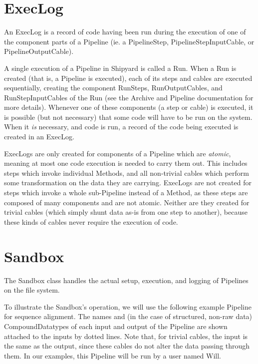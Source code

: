 \documentclass[12pt]{article}
\begin{document}
\section*{ExecLog}

An ExecLog is a record of code having been run during the execution of
one of the component parts of a Pipeline (ie. a PipelineStep,
PipelineStepInputCable, or PipelineOutputCable).

A single execution of a Pipeline in Shipyard is called a Run. When a Run
is created (that is, a Pipeline is executed), each of its steps and
cables are executed sequentially, creating the component RunSteps,
RunOutputCables, and RunStepInputCables of the Run (see the Archive and
Pipeline documentation for more details). Whenever one of these
components (a step or cable) is executed, it is possible (but not
necessary) that some code will have to be run on the system. When it
\emph{is} necessary, and code is run, a record of the code being
executed is created in an ExecLog. 

ExecLogs are only created for components of a Pipeline which are
\emph{atomic}, meaning at most one code execution is needed to carry
them out. This includes steps which invoke individual Methods, and all
non-trivial cables which perform some transformation on the data they
are carrying. ExecLogs are not created for steps which invoke a whole
sub-Pipeline instead of a Method, as these steps are composed of many
components and are not atomic. Neither are they created for trivial
cables (which simply shunt data as-is from one step to another), because
these kinds of cables never require the execution of code.

\section*{Sandbox}

The Sandbox class handles the actual setup, execution, and logging of Pipelines
on the file system. 

To illustrate the Sandbox's operation, we will use the following example
Pipeline for sequence alignment. The names and (in the case of structured,
non-raw data) CompoundDatatypes of each input and output of the Pipeline are
shown attached to the inputs by dotted lines. Note that, for trivial cables,
the input is the same as the output, since these cables do not alter the data
passing through them. In our examples, this Pipeline will be run by a user
named Will.
\end{document}
